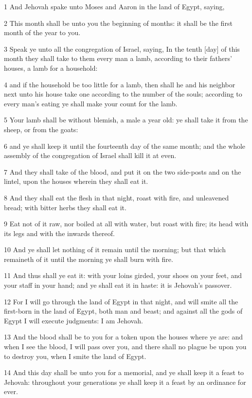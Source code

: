 \par 1 And Jehovah spake unto Moses and Aaron in the land of Egypt, saying,
\par 2 This month shall be unto you the beginning of months: it shall be the first month of the year to you.
\par 3 Speak ye unto all the congregation of Israel, saying, In the tenth [day] of this month they shall take to them every man a lamb, according to their fathers' houses, a lamb for a household:
\par 4 and if the household be too little for a lamb, then shall he and his neighbor next unto his house take one according to the number of the souls; according to every man's eating ye shall make your count for the lamb.
\par 5 Your lamb shall be without blemish, a male a year old: ye shall take it from the sheep, or from the goats:
\par 6 and ye shall keep it until the fourteenth day of the same month; and the whole assembly of the congregation of Israel shall kill it at even.
\par 7 And they shall take of the blood, and put it on the two side-posts and on the lintel, upon the houses wherein they shall eat it.
\par 8 And they shall eat the flesh in that night, roast with fire, and unleavened bread; with bitter herbs they shall eat it.
\par 9 Eat not of it raw, nor boiled at all with water, but roast with fire; its head with its legs and with the inwards thereof.
\par 10 And ye shall let nothing of it remain until the morning; but that which remaineth of it until the morning ye shall burn with fire.
\par 11 And thus shall ye eat it: with your loins girded, your shoes on your feet, and your staff in your hand; and ye shall eat it in haste: it is Jehovah's passover.
\par 12 For I will go through the land of Egypt in that night, and will smite all the first-born in the land of Egypt, both man and beast; and against all the gods of Egypt I will execute judgments: I am Jehovah.
\par 13 And the blood shall be to you for a token upon the houses where ye are: and when I see the blood, I will pass over you, and there shall no plague be upon you to destroy you, when I smite the land of Egypt.
\par 14 And this day shall be unto you for a memorial, and ye shall keep it a feast to Jehovah: throughout your generations ye shall keep it a feast by an ordinance for ever.
